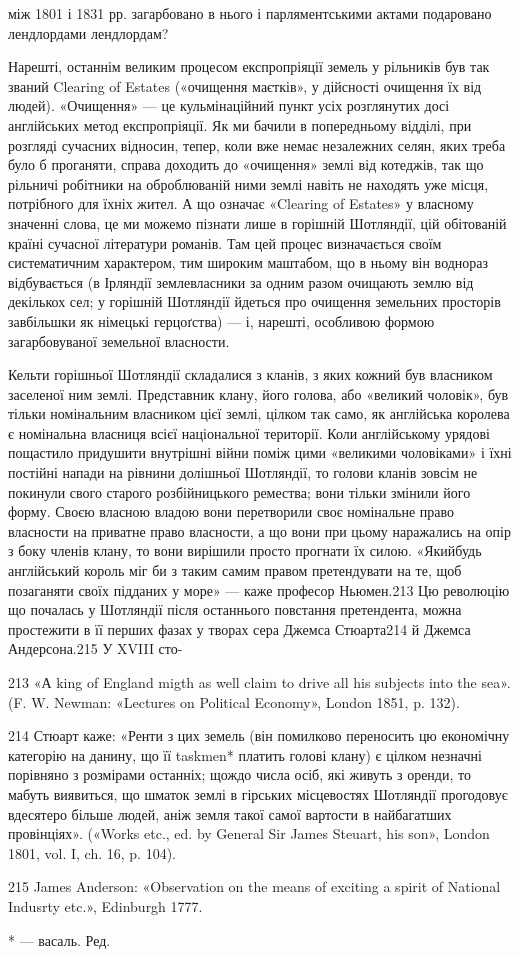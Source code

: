 між 1801 і 1831 рр. загарбовано в нього і парляментськими актами подаровано лендлордами лендлордам?

Нарешті, останнім великим процесом експропріяції земель у рільників був так званий Clearing of
Estates («очищення маєтків», у дійсності очищення їх від людей). «Очищення» — це кульмінаційний
пункт усіх розглянутих досі англійських метод експропріяції. Як ми бачили в попередньому відділі,
при розгляді сучасних відносин, тепер, коли вже немає незалежних селян, яких треба було б проганяти,
справа доходить до «очищення» землі від котеджів, так що рільничі робітники на оброблюваній ними
землі навіть не находять уже місця, потрібного для їхніх жител. А що означає «Clearing of Estates» у
власному значенні слова, це ми можемо пізнати лише в горішній Шотляндії, цій обітованій країні
сучасної літератури романів. Там цей процес
визначається своїм систематичним характером, тим широким маштабом, що в ньому він воднораз
відбувається (в Ірляндії землевласники за одним разом очищають землю від декількох сел; у горішній
Шотляндії йдеться про очищення земельних просторів
завбільшки як німецькі герцоґства) — і, нарешті, особливою формою загарбовуваної земельної
власности.

Кельти горішньої Шотляндії складалися з кланів, з яких кожний був власником заселеної ним землі.
Представник клану, його голова, або «великий чоловік», був тільки номінальним власником цієї землі,
цілком так само, як англійська королева є номінальна власниця всієї національної території. Коли
англійському урядові пощастило придушити внутрішні війни поміж цими «великими чоловіками» і їхні
постійні напади на рівнини долішньої Шотляндії, то голови кланів зовсім не покинули свого старого
розбійницького ремества; вони тільки змінили його форму. Своєю власною владою вони перетворили своє
номінальне право власности на приватне право власности, а що вони при цьому наражались на опір з
боку членів клану, то вони вирішили просто прогнати їх силою. «Якийбудь англійський король міг би з
таким самим правом претендувати на те, щоб позаганяти своїх підданих у море» — каже професор
Ньюмен.213 Цю революцію що почалась у Шотляндії після останнього повстання претендента, можна
простежити в її перших фазах у творах сера Джемса Стюарта214 й Джемса Андерсона.215 У XVIII сто-

213 «А king of England migth as well claim to drive all his subjects into the sea». (F. W. Newman:
«Lectures on Political Economy», London 1851, p. 132).

214 Стюарт каже: «Ренти з цих земель (він помилково переносить цю економічну категорію на данину, що
її taskmen* платить голові клану) є цілком незначні порівняно з розмірами останніх; щождо числа
осіб, які живуть з оренди, то мабуть виявиться, що шматок землі в гірських місцевостях Шотляндії
прогодовує вдесятеро більше людей, аніж земля такої самої вартости в найбагатших провінціях».
(«Works etc., ed. by General Sir James Steuart, his son», London 1801, vol. I, ch. 16, p. 104).

215 James Anderson: «Observation on the means of exciting a spirit of National Indusrty etc.»,
Edinburgh 1777.

* — васаль. Ред.
